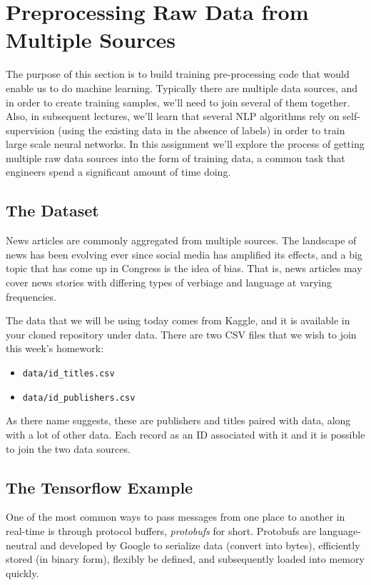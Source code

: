 \documentclass[paper=a4, fontsize=11pt]{scrartcl} %
\begin{document}
\maketitle %

\section{Preprocessing Raw Data from Multiple Sources}

The purpose of this section is to build training pre-processing code that would enable us to do machine learning. Typically there are multiple data sources, and in order to create training samples, we'll need to join several of them together. Also, in subsequent lectures, we'll learn that several NLP algorithms rely on self-supervision (using the existing data in the absence of labels) in order to train large scale neural networks. In this assignment we'll explore the process of getting multiple raw data sources into the form of training data, a common task that engineers spend a significant amount of time doing. 

\subsection{The Dataset}

News articles are commonly aggregated from multiple sources. The landscape of news has been evolving ever since social media has amplified its effects, and a big topic that has come up in Congress is the idea of bias. That is, news articles may cover news stories with differing types of verbiage and language at varying frequencies. 

The data that we will be using today comes from Kaggle, and it is available in your cloned repository under data. There are two CSV files that we wish to join this week's homework:

\begin{itemize}
    \item \verb"data/id_titles.csv"
    \item \verb"data/id_publishers.csv"
\end{itemize}

As there name suggests, these are publishers and titles paired with data, along with a lot of other data. Each record as an ID associated with it and it is possible to join the two data sources.

\subsection{The Tensorflow Example}
One of the most common ways to pass messages from one place to another in real-time is through protocol buffers, \emph{protobufs} for short. Protobufs are language-neutral and developed by Google to serialize data (convert into bytes), efficiently stored (in binary form), flexibly be defined, and subsequently loaded into memory quickly. 
\end{document}
